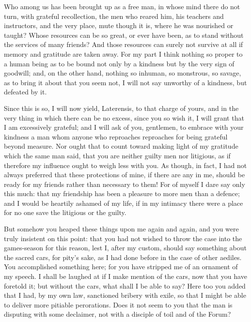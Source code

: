  Who among us has been brought up as a free man, in whose mind there do not turn, with grateful recollection, the men who reared him, his teachers and instructors, and the very place, mute though it is, where he was nourished or taught? Whose resources can be so great, or ever have been, as to stand without the services of many friends? And those resources can surely not survive at all if memory and gratitude are taken away. For my part I think nothing so proper to a human being as to be bound not only by a kindness but by the very sign of goodwill; and, on the other hand, nothing so inhuman, so monstrous, so savage, as to bring it about that you seem not, I will not say unworthy of a kindness, but defeated by it.

 Since this is so, I will now yield, Laterensis, to that charge of yours, and in the very thing in which there can be no excess, since you so wish it, I will grant that I am excessively grateful; and I will ask of you, gentlemen, to embrace with your kindness a man whom anyone who reproaches reproaches for being grateful beyond measure. Nor ought that to count toward making light of my gratitude which the same man said, that you are neither guilty men nor litigious, as if therefore my influence ought to weigh less with you. As though, in fact, I had not always preferred that these protections of mine, if there are any in me, should be ready for my friends rather than necessary to them! For of myself I dare say only this much: that my friendship has been a pleasure to more men than a defence; and I would be heartily ashamed of my life, if in my intimacy there were a place for no one save the litigious or the guilty.

 But somehow you heaped these things upon me again and again, and you were truly insistent on this point: that you had not wished to throw the case into the games-season for this reason, lest I, after my custom, should say something about the sacred cars, for pity's sake, as I had done before in the case of other aediles. You accomplished something here; for you have stripped me of an ornament of my speech. I shall be laughed at if I make mention of the cars, now that you have foretold it; but without the cars, what shall I be able to say? Here too you added that I had, by my own law, sanctioned bribery with exile, so that I might be able to deliver more pitiable perorations. Does it not seem to you that the man is disputing with some declaimer, not with a disciple of toil and of the Forum?

